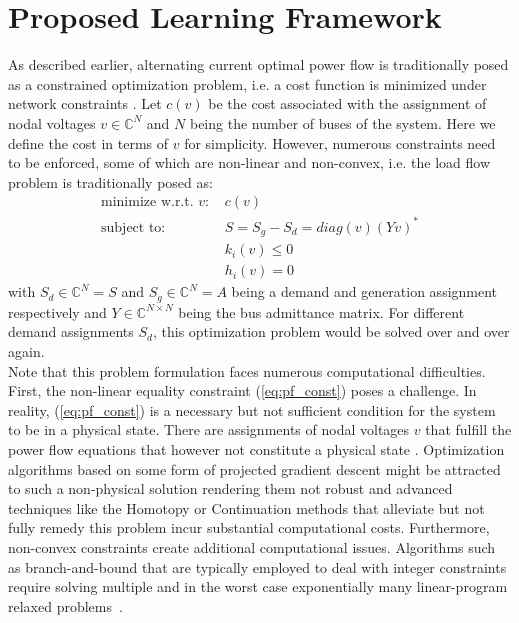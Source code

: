 \section{Proposed Learning Framework}
As described earlier, alternating current optimal power flow is traditionally posed as a constrained optimization problem, i.e. a cost function is minimized under network constraints \cite{carpentier1962contribution}. Let $c(v)$ be the cost associated with the assignment of nodal voltages $v \in \mathbb{C}^N$ and $N$ being the number of buses of the system. Here we define the cost in terms of $v$ for simplicity. However, numerous constraints need to be enforced, some of which are non-linear and non-convex, i.e. the load flow problem is traditionally posed as:
\begin{align}
\text{minimize w.r.t. $v$:\ }& c(v)\\
\text{subject to:\ }& S = S_{g} - S_{d} = diag(v)(Yv)^* \label{eq:pf_const}\\
 & k_i(v) \leq 0\\
 & h_i(v) = 0
\end{align}
with $S_d\in \mathbb{C}^N = S$ and $S_g\in \mathbb{C}^N = A$ being a demand and generation assignment respectively and $Y\in \mathbb{C}^{N \times N}$ being the bus admittance matrix.
For different demand assignments $S_d$, this optimization problem would be solved over and over again.\\
Note that this problem formulation faces numerous computational difficulties. First, the non-linear equality constraint (\ref{eq:pf_const}) poses a challenge. In reality, (\ref{eq:pf_const}) is a necessary but not sufficient condition for the system to be in a physical state. There are assignments of nodal voltages $v$ that fulfill the power flow equations that however not constitute a physical state \cite{tamura1983relationship,thorp1997load}. Optimization algorithms based on some form of projected gradient descent might be attracted to such a non-physical solution rendering them not robust and advanced techniques like the Homotopy \cite{okumura1991solution} or Continuation \cite{milano2009continuous} methods that alleviate but not fully remedy this problem incur substantial computational costs. Furthermore, non-convex constraints create additional computational issues. Algorithms such as branch-and-bound that are typically employed to deal with integer constraints require solving multiple and in the worst case exponentially many linear-program relaxed problems~\cite{lawler1966branch}.\\

